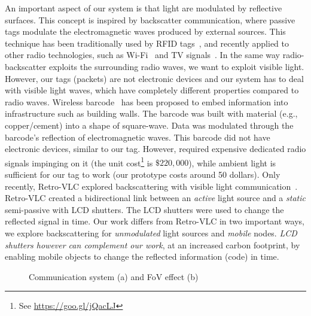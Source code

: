 \documentclass[10pt]{sig-alternate-05-2015}
\begin{document}
{An important aspect of our system is that light are modulated by reflective surfaces. This concept is inspired by backscatter communication, where passive tags modulate the electromagnetic waves produced by external sources. This technique has been traditionally used by RFID tags}~\cite{want2004enabling}, and recently applied to other radio technologies, such as Wi-Fi~\cite{Kellogg:2014} and TV signals~\cite{Liu:2013}. In the same way radio-backscatter exploits the surrounding radio waves, we want to exploit visible light. However, our tags (packets) are not electronic devices and our system has to deal with visible light waves, which have completely different properties compared to radio waves. Wireless barcode~\cite{Moshir2014} has been proposed to embed information into infrastructure such as building walls. The barcode was built with material (e.g., copper/cement) into a shape of square-wave. Data was modulated through the barcode's reflection of electromagnetic waves. This barcode did not have electronic devices, similar to our tag. However, \cite{Moshir2014} required expensive dedicated radio signals impinging on it (the unit cost\footnote{{See \url{https://goo.gl/jQacLJ}}} is $\$220,000$), while ambient light is sufficient for our tag to work (our prototype costs around 50 dollars). Only recently, Retro-VLC explored backscattering with visible light communication~\cite{Li:2015}. Retro-VLC created a bidirectional link between an \emph{active} light source and a \emph{static} semi-passive with LCD shutters. The LCD shutters were used to change the reflected signal in time. Our work differs from Retro-VLC in two important ways, we explore backscattering for \emph{unmodulated} light sources and \emph{mobile} nodes. \emph{LCD shutters however can complement our work}, at an increased carbon footprint, by enabling mobile objects to change the reflected information (code) in time.

\begin{figure}[t!]
	\hfill
	\vspace{-5mm}
	\caption{Communication system (a) and FoV effect (b)}
	\vspace{-3mm}
\end{figure}
\end{document}
